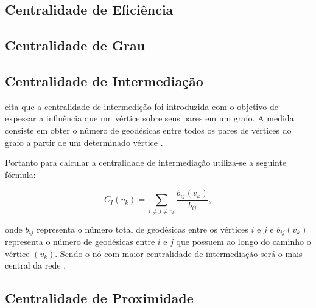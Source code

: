 \documentclass[12pt]{article}
\begin{document}
\subsection{Centralidade de Eficiência}
\subsection{Centralidade de Grau}
\subsection{Centralidade de Intermediação}
\cite{freitas} cita que a centralidade de intermedição foi introduzida com o objetivo de expessar a influência que um vértice sobre seus pares em um grafo.
A medida consiste em obter o número de geodésicas entre todos os pares de vértices do grafo a partir de um determinado vértice \cite{freitas}.

Portanto para calcular a centralidade de intermediação utiliza-se a seguinte fórmula: 
\begin{center}
\begin{equation}
C_I(v_k)=\sum_{i\neq j \neq v_{k}} \frac{b_{ij}(v_k)}{b_{ij}},
\end{equation}
\end{center}
onde $b_{ij}$ representa o número total de geodésicas entre os vértices $i$ e $j$ e  $b_{ij}(v_k)$ representa o número de geodésicas entre $i$ e $j$ que possuem ao longo do caminho o vértice $(v_k)$.
Sendo o nó com maior centralidade de intermediação será o mais central da rede \cite{ufimtsev} \cite{freeman}.

\subsection{Centralidade de Proximidade}
\end{document}
